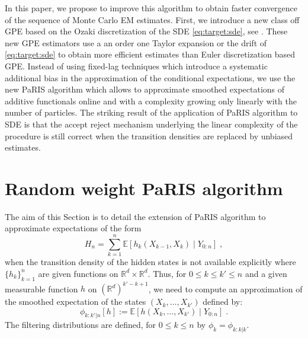 \documentclass[12pt]{article}
\newcommand{\eqsp}{\;}
\newcommand{\1}{\mathrm{1}}
\begin{document}
In this paper, we propose to improve this algorithm to obtain faster convergence of the sequence of Monte Carlo EM estimates. First, we introduce a new class off GPE based on the Ozaki discretization of the SDE  \eqref{eq:target:sde}, see \cite{ozaki:1992,shoji:ozaki:1998}. 
These new GPE estimators use a an order one Taylor expansion or the drift of \eqref{eq:target:sde} to obtain more efficient estimates than Euler discretization based GPE. Instead of using fixed-lag techniques which introduce a systematic additional bias  in the approximation of the conditional expectations, we use the new PaRIS algorithm which allows to approximate smoothed expectations of additive functionals online and with a complexity growing only linearly with the number of particles. The striking result of the application of PaRIS algorithm to SDE is that the accept reject mechanism underlying the linear complexity of the procedure is still correct when the transition densities are replaced by unbiased estimates.

\section{Random weight PaRIS algorithm}
The aim of this Section is to detail the extension of PaRIS algorithm to approximate expectations of the form
\begin{equation}
\label{def:addfunc}
H_{n} =  \sum_{k=1}^n\mathbb{E}\left[h_k(X_{k-1},X_k)\middle|Y_{0:n}\right]\eqsp,
\end{equation}
when the transition density of the hidden states is not available explicitly where $\{h_k\}_{k=1}^n$ are given functions on $\mathbb{R}^d\times \mathbb{R}^d$. Thus, for $0 \leq k \leq k' \leq n$ and a given measurable function $h$ on $(\mathbb{R}^d)^{k'-k + 1}$, we need to compute an approximation of the smoothed expectation of the states $(X_k,\ldots,X_{k'})$ defined by:
\[
\phi_{k:k'|n}[h] := \mathbb{E}\left[h(X_k,\ldots,X_{k'})\middle|Y_{0:n}\right]\eqsp.
\]
The filtering distributions are defined, for $0\le k\le n$ by $\phi_{k} = \phi_{k:k|k}$. %
\end{document}
